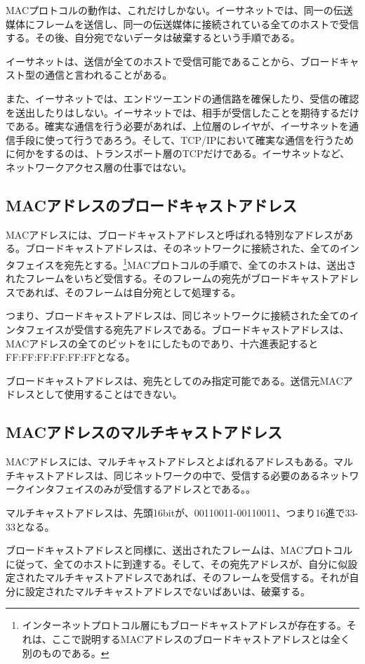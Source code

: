 MACプロトコルの動作は、これだけしかない。イーサネットでは、同一の伝送媒体にフレームを送信し、同一の伝送媒体に接続されている全てのホストで受信する。その後、自分宛でないデータは破棄するという手順である。

イーサネットは、送信が全てのホストで受信可能であることから、ブロードキャスト型の通信と言われることがある。

また、イーサネットでは、エンドツーエンドの通信路を確保したり、受信の確認を送出したりはしない。イーサネットでは、相手が受信したことを期待するだけである。確実な通信を行う必要があれば、上位層のレイヤが、イーサネットを通信手段に使って行うであろう。そして、TCP/IPにおいて確実な通信を行うために何かをするのは、トランスポート層のTCPだけである。イーサネットなど、ネットワークアクセス層の仕事ではない。


\subsection{MACアドレスのブロードキャストアドレス}

MACアドレスには、ブロードキャストアドレスと呼ばれる特別なアドレスがある。ブロードキャストアドレスは、そのネットワークに接続された、全てのインタフェイスを宛先とする。\footnote{インターネットプロトコル層にもブロードキャストアドレスが存在する。それは、ここで説明するMACアドレスのブロードキャストアドレスとは全く別のものである。}MACプロトコルの手順で、全てのホストは、送出されたフレームをいちど受信する。そのフレームの宛先がブロードキャストアドレスであれば、そのフレームは自分宛として処理する。

つまり、ブロードキャストアドレスは、同じネットワークに接続された全てのインタフェイスが受信する宛先アドレスである。ブロードキャストアドレスは、MACアドレスの全てのビットを1にしたものであり、十六進表記するとFF:FF:FF:FF:FF:FFとなる。

ブロードキャストアドレスは、宛先としてのみ指定可能である。送信元MACアドレスとして使用することはできない。

\subsection{MACアドレスのマルチキャストアドレス}
MACアドレスには、マルチキャストアドレスとよばれるアドレスもある。マルチキャストアドレスは、同じネットワークの中で、受信する必要のあるネットワークインタフェイスのみが受信するアドレスとである。。

マルチキャストアドレスは、先頭16bitが、00110011-00110011、つまり16進で33-33となる。

ブロードキャストアドレスと同様に、送出されたフレームは、MACプロトコルに従って、全てのホストに到達する。そして、その宛先アドレスが、自分に似設定されたマルチキャストアドレスであれば、そのフレームを受信する。それが自分に設定されたマルチキャストアドレスでないばあいは、破棄する。

